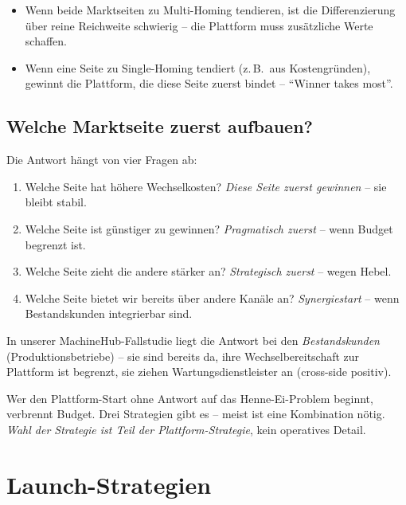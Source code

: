 \documentclass[11pt,a4paper,oneside]{article}
\begin{document}
\begin{itemize}
  \item Wenn beide Marktseiten zu Multi-Homing tendieren, ist die Differenzierung über reine Reichweite schwierig -- die Plattform muss zusätzliche Werte schaffen.
  \item Wenn eine Seite zu Single-Homing tendiert (z.\,B.\ aus Kostengründen), gewinnt die Plattform, die diese Seite zuerst bindet -- ``Winner takes most''.
\end{itemize}

\subsection{Welche Marktseite zuerst aufbauen?}

Die Antwort hängt von vier Fragen ab:

\begin{enumerate}
  \item Welche Seite hat höhere Wechselkosten? \emph{Diese Seite zuerst gewinnen} -- sie bleibt stabil.
  \item Welche Seite ist günstiger zu gewinnen? \emph{Pragmatisch zuerst} -- wenn Budget begrenzt ist.
  \item Welche Seite zieht die andere stärker an? \emph{Strategisch zuerst} -- wegen Hebel.
  \item Welche Seite bietet wir bereits über andere Kanäle an? \emph{Synergiestart} -- wenn Bestandskunden integrierbar sind.
\end{enumerate}

In unserer MachineHub-Fallstudie liegt die Antwort bei den \emph{Bestandskunden} (Produktionsbetriebe) -- sie sind bereits da, ihre Wechselbereitschaft zur Plattform ist begrenzt, sie ziehen Wartungsdienstleister an (cross-side positiv).

\begin{merkbox}
Wer den Plattform-Start ohne Antwort auf das Henne-Ei-Problem beginnt, verbrennt Budget. Drei Strategien gibt es -- meist ist eine Kombination nötig. \emph{Wahl der Strategie ist Teil der Plattform-Strategie}, kein operatives Detail.
\end{merkbox}

\section{Launch-Strategien}
\end{document}

